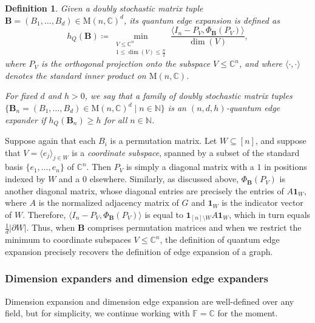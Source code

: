 \documentclass[11pt]{article}
\newtheorem{definition}[theorem]{Definition}
\newcommand{\N}{{\mathbb N}}
\theoremstyle{plain}
\numberwithin{equation}{section}
\theoremstyle{definition}
\newcommand{\F}{\mathbb{F}}
\newcommand{\bC}{\mathbb{C}}
\newcommand{\ab}[1]{\left\lvert#1\right\rvert}
\newcommand{\M}{\mathrm{M}}
\newcommand{\tuple}[1]{\mathbf{#1}}
\newcommand{\vB}{\tuple{B}}
\begin{document}
\begin{definition}
    Given a doubly stochastic matrix tuple $\vB =(B_1,\dots,B_d) \in \M(n,\bC)^d$, its \emph{quantum edge expansion} is defined as
    \begin{equation}\label{eq: quantum edge expansion}
    h_Q(\vB)\coloneqq \min_{\substack{V\leq \bC^n\\ 1\leq\dim(V)\leq \frac n2}}\frac{\langle 
    I_n-P_V,\Phi_\vB(P_V)\rangle}{\dim(V)},
    \end{equation}
    where $P_V$ is the orthogonal projection onto the subspace $V\leq \bC^n$, and where $\langle \cdot,\cdot\rangle$ denotes the standard inner product on $\M(n,\bC)$.
    
    For fixed $d$ and $h>0$, we say that a family of doubly stochastic matrix tuples $\{\vB_n=(B_1, \dots, B_d)\in \M(n, \bC)^d\mid n\in \N\}$ is an \emph{$(n,d,h)$-quantum edge expander} if $h_Q(\vB_n)\geq h$ for all $n\in\N$. 
\end{definition}
Suppose again that each $B_i$ is a permutation matrix. Let $W \subseteq [n]$, and suppose that $V = \langle e_j\rangle_{j \in W}$ is a \emph{coordinate subspace}, spanned by a subset of the standard basis $\{e_1,\dots,e_n\}$ of $\bC^n$. Then $P_V$ is simply a diagonal matrix with a $1$ in positions indexed by $W$ and a $0$ elsewhere. Similarly, as discussed above, $\Phi_\vB(P_V)$ is another diagonal matrix, whose diagonal entries are precisely the entries of $A\mathbf 1_W$, where $A$ is the normalized adjacency matrix of $G$ and $\mathbf 1_W$ is the indicator vector of $W$. Therefore, $\langle I_n-P_V, \Phi_\vB(P_V) \rangle$ is equal to $\mathbf 1_{[n] \setminus W} A \mathbf 1_W$, which in turn equals $\frac 1 d \ab{\partial W}$. Thus, when $\vB$ comprises permutation matrices and when we restrict the minimum to coordinate subspaces $V \leq \bC^n$, the definition of quantum edge expansion precisely recovers the definition of edge expansion of a graph.

\subsubsection{Dimension expanders and dimension edge expanders}\label{subsec:dim_exp}
Dimension expansion and dimension edge expansion are well-defined over any field, but for simplicity, we continue working with $\F=\bC$ for the moment.
\end{document}
